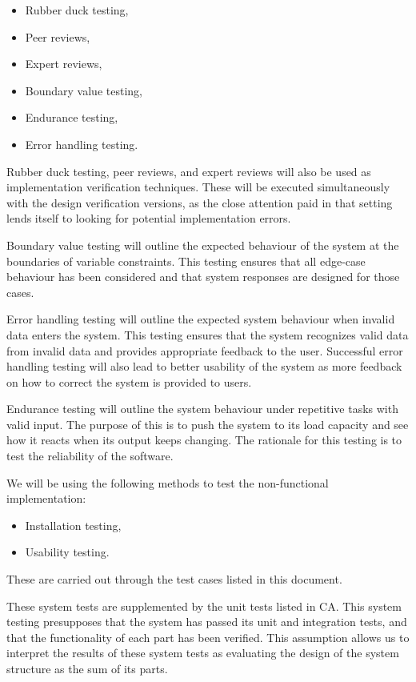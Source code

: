 \documentclass[12pt, titlepage]{article}
\begin{document}
\begin{itemize}
	\item Rubber duck testing,
	\item Peer reviews,
	\item Expert reviews,
	\item Boundary value testing,
	\item Endurance testing,
	\item Error handling testing.
\end{itemize}

Rubber duck testing, peer reviews, and expert reviews will also be used as 
implementation verification techniques. These will be executed simultaneously 
with the design verification versions, as the close attention paid in that 
setting lends itself to looking for potential implementation errors.

Boundary value testing will outline the expected behaviour of the system at the 
boundaries of variable constraints. This testing ensures that all edge-case 
behaviour has been considered and that system responses are designed for those 
cases.

Error handling testing will outline the expected system behaviour when invalid 
data enters the system. This testing ensures that the system recognizes valid 
data from invalid data and provides appropriate feedback to the user. 
Successful error handling testing will also lead to better usability of the 
system as more feedback on how to correct the system is provided to users.

Endurance testing will outline the system behaviour under repetitive tasks with 
valid input. The purpose of this is to push the system to its load capacity and 
see how it reacts when its output keeps changing. The rationale for this 
testing is to test the reliability of the software.

We will be using the following methods to test the non-functional 
implementation:

\begin{itemize}
	\item Installation testing,
	\item Usability testing.
\end{itemize}

These are carried out through the test cases listed in this document.

These system tests are supplemented by the unit tests listed in CA. 
This system testing presupposes that the system has passed its unit and 
integration tests, and that the functionality of each part has been verified. 
This assumption allows us to interpret the results of these system tests as 
evaluating the design of the system structure as the sum of its parts.
\end{document}
